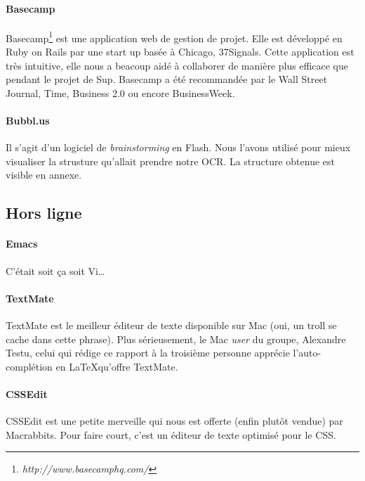 \documentclass[]{report}
\begin{document}
			\paragraph{Basecamp\\} %
			\label{par:basecamp}
			Basecamp\footnote{\emph{http://www.basecamphq.com/}} est une application web de gestion de projet. Elle est développ\'e en Ruby on Rails par une start up bas\'ee \`a Chicago, 37Signals. Cette application est tr\`es intuitive, elle nous a beacoup aid\'e \`a collaborer de mani\`ere plus efficace que pendant le projet de Sup. Basecamp a \'et\'e recommand\'ee par le Wall Street Journal, Time, Business 2.0 ou encore BusinessWeek.
			\paragraph{Bubbl.us\\} %
			\label{par:bubbl_us}
			Il s'agit d'un logiciel de \emph{brainstorming} en Flash. Nous l'avons utilis\'e pour mieux visualiser la strusture qu'allait prendre notre OCR. La structure obtenue est visible en annexe. %
		\subsection{Hors ligne} %
		\label{sub:hors_ligne}
			\paragraph{Emacs\\} %
			\label{par:emacs}
				C'\'etait soit \c ca soit Vi\ldots
			\paragraph{TextMate\\} %
			\label{par:textmate}
				TextMate est le meilleur \'editeur de texte disponible sur Mac (oui, un troll se cache dans cette phrase). Plus s\'erieusement, le Mac \emph{user} du groupe, Alexandre Testu, celui qui r\'edige ce rapport \`a la troisi\`eme personne appr\'ecie l'auto-compl\'etion en \LaTeX qu'offre TextMate.
			\paragraph{CSSEdit} %
			\label{par:cssedit}
			CSSEdit est une petite merveille qui nous est offerte (enfin plut\^ot vendue) par Macrabbits. Pour faire court, c'est un \'editeur de texte optimis\'e pour le CSS.
\end{document}
